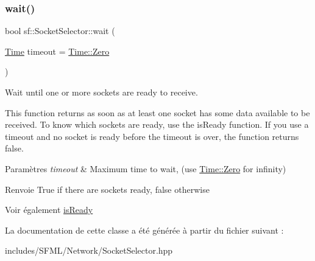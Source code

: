 \subsubsection{\texorpdfstring{wait()}{wait()}}
{\footnotesize\ttfamily bool sf\+::\+Socket\+Selector\+::wait (\begin{DoxyParamCaption}\item[{\hyperlink{classsf_1_1Time}{Time}}]{timeout = {\ttfamily \hyperlink{classsf_1_1Time_a8db127b632fa8da21550e7282af11fa0}{Time\+::\+Zero}} }\end{DoxyParamCaption})}



Wait until one or more sockets are ready to receive. 

This function returns as soon as at least one socket has some data available to be received. To know which sockets are ready, use the is\+Ready function. If you use a timeout and no socket is ready before the timeout is over, the function returns false.


\begin{DoxyParams}{Paramètres}
{\em timeout} & Maximum time to wait, (use \hyperlink{classsf_1_1Time_a8db127b632fa8da21550e7282af11fa0}{Time\+::\+Zero} for infinity)\\
\hline
\end{DoxyParams}
\begin{DoxyReturn}{Renvoie}
True if there are sockets ready, false otherwise
\end{DoxyReturn}
\begin{DoxySeeAlso}{Voir également}
\hyperlink{classsf_1_1SocketSelector_a917a4bac708290a6782e6686fd3bf889}{is\+Ready} 
\end{DoxySeeAlso}


La documentation de cette classe a été générée à partir du fichier suivant \+:\begin{DoxyCompactItemize}
\item 
includes/\+S\+F\+M\+L/\+Network/Socket\+Selector.\+hpp\end{DoxyCompactItemize}
